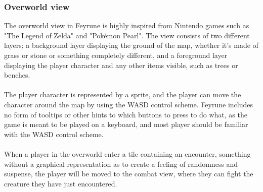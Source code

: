 \subsubsection{Overworld view}
The overworld view in Feyrune is highly inspired from Nintendo games such as "The Legend of Zelda" and "Pokémon Pearl". The view consists of two different layers; a background layer displaying the ground of the map, whether it's made of grass or stone or something completely different, and a foreground layer displaying the player character and any other items visible, such as trees or benches.\\
\\
The player character is represented by a sprite, and the player can move the character around the map by using the WASD control scheme. Feyrune includes no form of tooltips or other hints to which buttons to press to do what, as the game is meant to be played on a keyboard, and most player should be familiar with the WASD control scheme.\\
\\
When a player in the overworld enter a tile containing an encounter, something without a graphical representation as to create a feeling of randomness and suspense, the player will be moved to the combat view, where they can fight the creature they have just encountered.\\